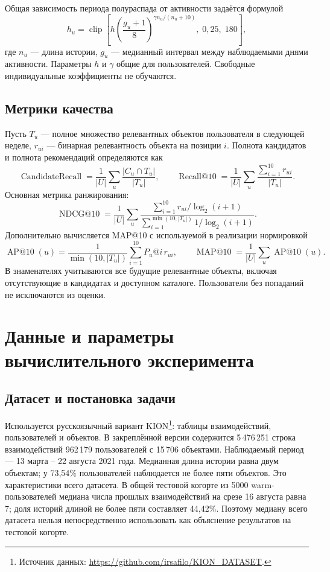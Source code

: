\documentclass[12pt,a4paper]{article}
\begin{document}
Общая зависимость периода полураспада от активности задаётся формулой
\begin{equation}
h_u=\operatorname{clip}\left[
h\left(\frac{g_u+1}{8}\right)^{\gamma n_u/(n_u+10)},\;0{,}25,\;180\right],
\end{equation}
где $n_u$ — длина истории, $g_u$ — медианный интервал между наблюдаемыми
днями активности. Параметры $h$ и $\gamma$ общие для пользователей.
Свободные индивидуальные коэффициенты не обучаются.

\subsection{Метрики качества}
Пусть $T_u$ — полное множество релевантных объектов пользователя
в следующей неделе, $r_{ui}$ — бинарная релевантность объекта на позиции $i$.
Полнота кандидатов и полнота рекомендаций определяются как
\begin{equation}
\operatorname{CandidateRecall}=\frac{1}{|U|}\sum_u
\frac{|C_u\cap T_u|}{|T_u|},\qquad
\operatorname{Recall@10}=\frac{1}{|U|}\sum_u
\frac{\sum_{i=1}^{10}r_{ui}}{|T_u|}.
\end{equation}
Основная метрика ранжирования:
\begin{equation}
\operatorname{NDCG@10}=\frac{1}{|U|}\sum_u
\frac{\sum_{i=1}^{10}r_{ui}/\log_2(i+1)}
{\sum_{i=1}^{\min(10,|T_u|)}1/\log_2(i+1)}.
\end{equation}
Дополнительно вычисляется MAP@10 с используемой в реализации нормировкой
\begin{equation}
\operatorname{AP@10}(u)=\frac{1}{\min(10,|T_u|)}
\sum_{i=1}^{10}P_u@i\,r_{ui},\qquad
\operatorname{MAP@10}=\frac{1}{|U|}\sum_u\operatorname{AP@10}(u).
\end{equation}
В знаменателях учитываются все будущие релевантные объекты, включая
отсутствующие в кандидатах и доступном каталоге. Пользователи без попаданий
не исключаются из оценки.

\section{Данные и параметры вычислительного эксперимента}
\subsection{Датасет и постановка задачи}
Используется русскоязычный вариант KION\footnote{Источник данных:
\url{https://github.com/irsafilo/KION_DATASET}.}: таблицы взаимодействий,
пользователей и объектов. В закреплённой версии содержится 5\,476\,251
строка взаимодействий 962\,179 пользователей с 15\,706 объектами.
Наблюдаемый период — 13 марта – 22 августа 2021 года.
Медианная длина истории равна двум объектам; у 73,54\% пользователей
наблюдается не более пяти объектов. Это характеристики всего датасета.
В общей тестовой когорте из 5000 warm-пользователей медиана числа
прошлых взаимодействий на срезе 16 августа равна 7; доля историй длиной
не более пяти составляет 44,42\%. Поэтому медиану всего датасета нельзя
непосредственно использовать как объяснение результатов на тестовой когорте.
\end{document}
